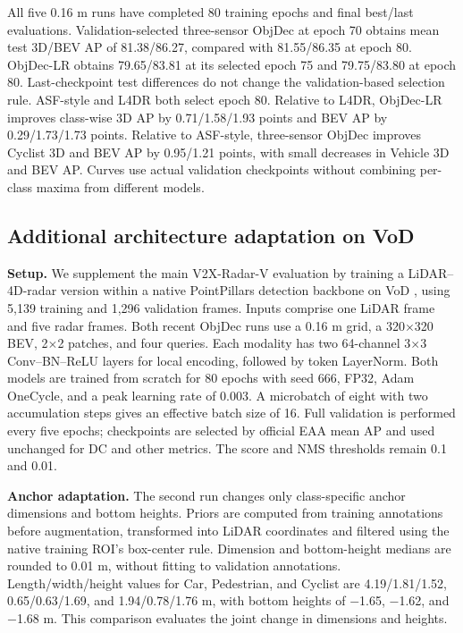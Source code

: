All five 0.16 m runs have completed 80 training epochs and final best/last evaluations. Validation-selected three-sensor ObjDec at epoch 70 obtains mean test 3D/BEV AP of 81.38/86.27, compared with 81.55/86.35 at epoch 80. ObjDec-LR obtains 79.65/83.81 at its selected epoch 75 and 79.75/83.80 at epoch 80. Last-checkpoint test differences do not change the validation-based selection rule. ASF-style and L4DR both select epoch 80. Relative to L4DR, ObjDec-LR improves class-wise 3D AP by 0.71/1.58/1.93 points and BEV AP by 0.29/1.73/1.73 points. Relative to ASF-style, three-sensor ObjDec improves Cyclist 3D and BEV AP by 0.95/1.21 points, with small decreases in Vehicle 3D and BEV AP.  Curves use actual validation checkpoints without combining per-class maxima from different models.

\subsection{Additional architecture adaptation on VoD}
\label{subsec:g4}

\textbf{Setup.} We supplement the main V2X-Radar-V evaluation by training a LiDAR--4D-radar version within a native PointPillars \citep{lang2019pointpillars} detection backbone on VoD \citep{palffy2022vod}, using 5,139 training and 1,296 validation frames. Inputs comprise one LiDAR frame and five radar frames. Both recent ObjDec runs use a 0.16 m grid, a 320\(\times\)320 BEV, 2\(\times\)2 patches, and four queries. Each modality has two 64-channel 3\(\times\)3 Conv--BN--ReLU layers for local encoding, followed by token LayerNorm. Both models are trained from scratch for 80 epochs with seed 666, FP32, Adam OneCycle, and a peak learning rate of 0.003. A microbatch of eight with two accumulation steps gives an effective batch size of 16. Full validation is performed every five epochs; checkpoints are selected by official EAA mean AP and used unchanged for DC and other metrics. The score and NMS thresholds remain 0.1 and 0.01.

\textbf{Anchor adaptation.} The second run changes only class-specific anchor dimensions and bottom heights. Priors are computed from training annotations before augmentation, transformed into LiDAR coordinates and filtered using the native training ROI's box-center rule. Dimension and bottom-height medians are rounded to 0.01 m, without fitting to validation annotations. Length/width/height values for Car, Pedestrian, and Cyclist are 4.19/1.81/1.52, 0.65/0.63/1.69, and 1.94/0.78/1.76 m, with bottom heights of \(-\)1.65, \(-\)1.62, and \(-\)1.68 m. This comparison evaluates the joint change in dimensions and heights.

